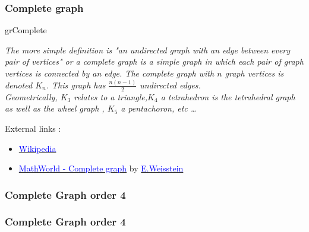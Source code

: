 \subsubsection{Complete graph}
\begin{NewMacroBox}{grComplete}{}

\medskip
\emph{The more simple definition is "an undirected graph with an edge between every pair of vertices"  or a complete graph  is a simple graph  in which each pair of graph vertices is connected by an edge. The complete graph  with  $n$ graph vertices is denoted $K_n$.  This graph has $\frac{n(n-1)}{2}$ undirected edges.\\
Geometrically, $K_3$ relates to a triangle,$ K_4$ a tetrahedron is the tetrahedral graph  as well as the wheel graph , $K_5$ a pentachoron, etc \dots}

\medskip
External links :

\medskip
\begin{itemize}

\item  \href{http://en.wikipedia.org/wiki/Complete_graph}%
            {\textcolor{blue}{Wikipedia}}

\item \href{http://mathworld.wolfram.com/grComplete.html}%
           {\textcolor{blue}{MathWorld - Complete graph}} by %
      \href{http://en.wikipedia.org/wiki/Eric_W._Weisstein}%
           {\textcolor{blue}{E.Weisstein}}
\end{itemize}
\end{NewMacroBox}


\subsubsection{Complete Graph order 4}
\begin{center}
\begin{tkzexample}[vbox]
\end{tkzexample}
\end{center}


\vfill\newpage\null

\subsubsection{Complete Graph order 4}
\begin{center}
\begin{tkzexample}[vbox]
\end{tkzexample}
\end{center}
\newpage
